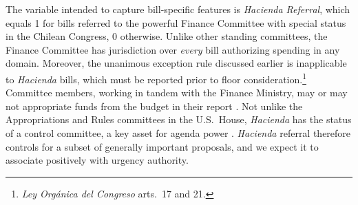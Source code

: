 \documentclass[letter,12pt]{article}
\begin{document}
The variable intended to capture bill-specific features is \emph{Hacienda Referral}, which equals 1 for bills referred to the powerful Finance Committee with special status in the Chilean Congress, 0 otherwise. Unlike other standing committees, the Finance Committee has jurisdiction over \emph{every} bill authorizing spending in any domain. Moreover, the unanimous exception rule discussed earlier is inapplicable to \emph{Hacienda} bills, which must be reported prior to floor consideration.\footnote{\emph{Ley Orgánica del Congreso} arts.\ 17 and 21.} Committee members, working in tandem with the Finance Ministry, may or may not appropriate funds from the budget in their report \citep{aleman.navia.UrgChi.2009}. Not unlike the Appropriations and Rules committees in the U.S.\ House, \emph{Hacienda} has the status of a control committee, a key asset for agenda power \citep{kiewiet.mccubbins.1991}. \emph{Hacienda} referral therefore controls for a subset of generally important proposals, and we expect it to associate positively with urgency authority.
\end{document}
